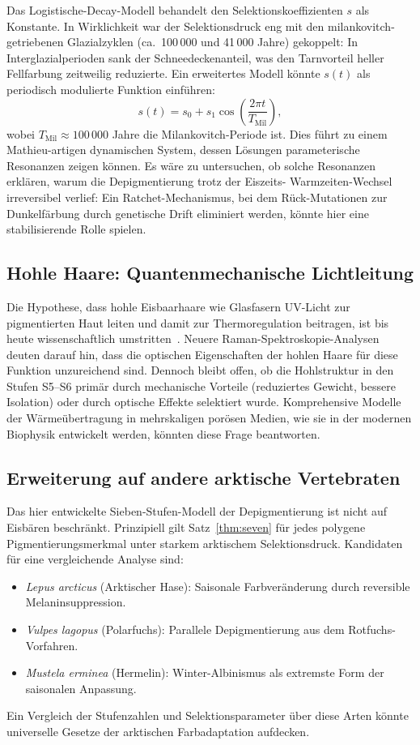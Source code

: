 ﻿\documentclass[12pt,a4paper]{article}
\theoremstyle{remark}
\begin{document}
Das Logistische-Decay-Modell behandelt den Selektionskoeffizienten $s$ als
Konstante. In Wirklichkeit war der Selektionsdruck eng mit den
milankovitch-getriebenen Glazialzyklen (ca.~100\,000 und 41\,000 Jahre)
gekoppelt: In Interglazialperioden sank der Schneedeckenanteil, was den
Tarnvorteil heller Fellfarbung zeitweilig reduzierte. Ein erweitertes Modell
k\"{o}nnte $s(t)$ als periodisch modulierte Funktion einf\"{u}hren:
\[
  s(t) = s_0 + s_1 \cos\!\left(\frac{2\pi t}{T_{\text{Mil}}}\right),
\]
wobei $T_{\text{Mil}} \approx 100\,000$ Jahre die Milankovitch-Periode ist.
Dies f\"{u}hrt zu einem Mathieu-artigen dynamischen System, dessen L\"{o}sungen
parameterische Resonanzen zeigen k\"{o}nnen. Es w\"{a}re zu untersuchen, ob
solche Resonanzen erkl\"{a}ren, warum die Depigmentierung trotz der Eiszeits-
Warmzeiten-Wechsel irreversibel verlief: Ein Ratchet-Mechanismus, bei dem
R\"{u}ck-Mutationen zur Dunkelf\"{a}rbung durch genetische Drift eliminiert
werden, k\"{o}nnte hier eine stabilisierende Rolle spielen.

\subsection{Hohle Haare: Quantenmechanische Lichtleitung}

Die Hypothese, dass hohle Eisbaarhaare wie Glasfasern UV-Licht zur
pigmentierten Haut leiten und damit zur Thermoregulation beitragen, ist
bis heute wissenschaftlich umstritten~\cite{koon1998}. Neuere
Raman-Spektroskopie-Analysen deuten darauf hin, dass die optischen
Eigenschaften der hohlen Haare f\"{u}r diese Funktion unzureichend sind.
Dennoch bleibt offen, ob die Hohlstruktur in den Stufen S5--S6 prim\"{a}r
durch mechanische Vorteile (reduziertes Gewicht, bessere Isolation) oder
durch optische Effekte selektiert wurde. Komprehensive Modelle der
W\"{a}rme\"{u}bertragung in mehrskaligen por\"{o}sen Medien, wie sie in der
modernen Biophysik entwickelt werden, k\"{o}nnten diese Frage beantworten.

\subsection{Erweiterung auf andere arktische Vertebraten}

Das hier entwickelte Sieben-Stufen-Modell der Depigmentierung ist nicht
auf Eisb\"{a}ren beschr\"{a}nkt. Prinzipiell gilt Satz~\ref{thm:seven} f\"{u}r
jedes polygene Pigmentierungsmerkmal unter starkem arktischem Selektionsdruck.
Kandidaten f\"{u}r eine vergleichende Analyse sind:
\begin{itemize}
  \item \textit{Lepus arcticus} (Arktischer Hase): Saisonale
        Farbver\"{a}nderung durch reversible Melaninsuppression.
  \item \textit{Vulpes lagopus} (Polarfuchs): Parallele Depigmentierung
        aus dem Rotfuchs-Vorfahren.
  \item \textit{Mustela erminea} (Hermelin): Winter-Albinismus als
        extremste Form der saisonalen Anpassung.
\end{itemize}
Ein Vergleich der Stufenzahlen und Selektionsparameter \"{u}ber diese Arten
k\"{o}nnte universelle Gesetze der arktischen Farbadaptation aufdecken.
\end{document}
